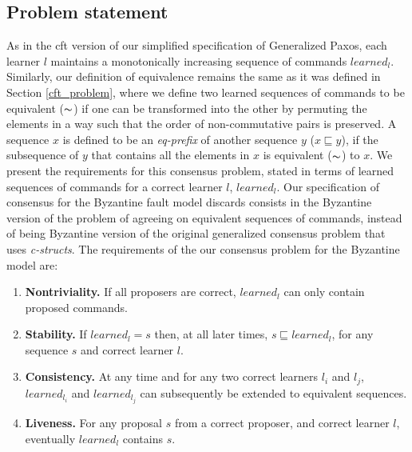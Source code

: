 \subsection{Problem statement}
As in the \acrshort{cft} version of our simplified specification of Generalized Paxos, each learner $l$ maintains a monotonically increasing sequence of commands $learned_l$. Similarly, our definition of equivalence remains the same as it was defined in Section \ref{cft_problem}, where we define two learned sequences of commands to be equivalent ($\thicksim$) if one can be transformed into the other by permuting the elements in a way such that the order of non-commutative pairs is preserved. A sequence $x$ is defined to be an \textit{eq-prefix} of another sequence $y$ ($x \sqsubseteq y$), if the subsequence of $y$ that contains all the elements in $x$ is equivalent ($\thicksim$) to $x$. 
We present the requirements for this consensus problem, stated in terms of learned sequences of commands for a correct learner $l$, $learned_l$. 
Our specification of consensus for the Byzantine fault model discards consists in the Byzantine version of the problem of agreeing on equivalent sequences of commands, instead of being Byzantine version of the original generalized consensus problem that uses \textit{c-structs}. The requirements of the our consensus problem for the Byzantine model are:\par
%
\begin{enumerate}
	\item \textbf{Nontriviality.} If all proposers are correct, $learned_l$ can only contain proposed commands.
	\item \textbf{Stability.} If $learned_l = s$ then, at all later times, $s \sqsubseteq learned_l$, for any sequence $s$ and correct learner $l$.
	\item \textbf{Consistency.} At any time and for any two correct learners $l_i$ and $l_j$, $learned_{l_i}$ and $learned_{l_j}$ can subsequently be extended to equivalent sequences.
	\item \textbf{Liveness.} For any proposal $s$ from a correct proposer, and correct learner $l$, eventually $learned_l$ contains $s$.
\end{enumerate}
